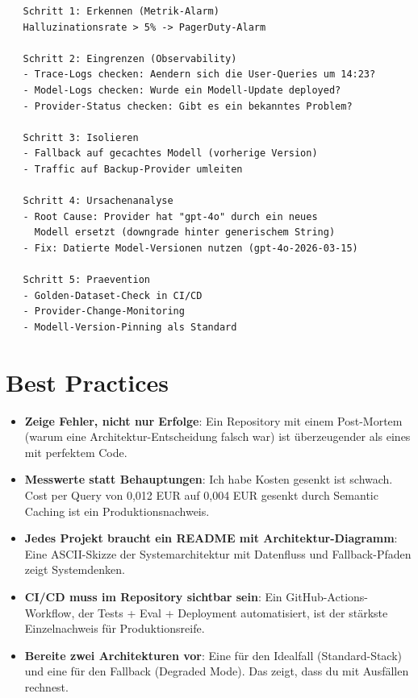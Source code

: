 \begin{verbatim}
   Schritt 1: Erkennen (Metrik-Alarm)
   Halluzinationsrate > 5% -> PagerDuty-Alarm

   Schritt 2: Eingrenzen (Observability)
   - Trace-Logs checken: Aendern sich die User-Queries um 14:23?
   - Model-Logs checken: Wurde ein Modell-Update deployed?
   - Provider-Status checken: Gibt es ein bekanntes Problem?

   Schritt 3: Isolieren
   - Fallback auf gecachtes Modell (vorherige Version)
   - Traffic auf Backup-Provider umleiten

   Schritt 4: Ursachenanalyse
   - Root Cause: Provider hat "gpt-4o" durch ein neues
     Modell ersetzt (downgrade hinter generischem String)
   - Fix: Datierte Model-Versionen nutzen (gpt-4o-2026-03-15)

   Schritt 5: Praevention
   - Golden-Dataset-Check in CI/CD
   - Provider-Change-Monitoring
   - Modell-Version-Pinning als Standard
\end{verbatim}

\section{Best Practices}

\begin{itemize}[leftmargin=*]
    \item \textbf{Zeige Fehler, nicht nur Erfolge}: Ein Repository mit einem Post-Mortem (warum eine Architektur-Entscheidung falsch war) ist überzeugender als eines mit perfektem Code.
    \item \textbf{Messwerte statt Behauptungen}: \glqq Ich habe Kosten gesenkt\grqq{} ist schwach. \glqq Cost per Query von 0,012 EUR auf 0,004 EUR gesenkt durch Semantic Caching\grqq{} ist ein Produktionsnachweis.
    \item \textbf{Jedes Projekt braucht ein README mit Architektur-Diagramm}: Eine ASCII-Skizze der Systemarchitektur mit Datenfluss und Fallback-Pfaden zeigt Systemdenken.
    \item \textbf{CI/CD muss im Repository sichtbar sein}: Ein GitHub-Actions-Workflow, der Tests + Eval + Deployment automatisiert, ist der stärkste Einzelnachweis für Produktionsreife.
    \item \textbf{Bereite zwei Architekturen vor}: Eine für den Idealfall (Standard-Stack) und eine für den Fallback (Degraded Mode). Das zeigt, dass du mit Ausfällen rechnest.
\end{itemize}

